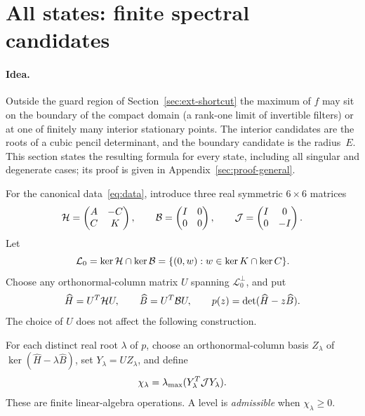 \section{All states: finite spectral candidates}
\label{sec:formula}

\paragraph{Idea.} Outside the guard region of Section~\ref{sec:ext-shortcut} the maximum of $f$ may sit on the boundary of the compact domain (a rank-one limit of invertible filters) or at one of finitely many interior stationary points. The interior candidates are the roots of a cubic pencil determinant, and the boundary candidate is the radius~$E$. This section states the resulting formula for every state, including all singular and degenerate cases; its proof is given in Appendix~\ref{sec:proof-general}.

For the canonical data~\eqref{eq:data}, introduce three real symmetric $6\times6$ matrices
\begin{equation}
 \mathcal H=\begin{pmatrix}A&-C\\C&K\end{pmatrix},\qquad
 \mathcal B=\begin{pmatrix}I&0\\0&0\end{pmatrix},\qquad
 \mathcal J=\begin{pmatrix}I&0\\0&-I\end{pmatrix}.
 \label{eq:pencil}
\end{equation}
Let
\begin{equation}
 \mathcal L_0=\ker\mathcal H\cap\ker\mathcal B
 =\{(0,w):w\in\ker K\cap\ker C\}.
\end{equation}
Choose any orthonormal-column matrix $U$ spanning $\mathcal L_0^\perp$, and put
\begin{equation}
 \widehat H=U^T\mathcal H U,\qquad \widehat B=U^T\mathcal B U,
 \qquad p(z)=\det(\widehat H-z\widehat B).
 \label{eq:regularized}
\end{equation}
The choice of $U$ does not affect the following construction.

For each distinct real root $\lambda$ of $p$, choose an orthonormal-column basis $Z_\lambda$ of
$\ker(\widehat H-\lambda\widehat B)$, set $Y_\lambda=UZ_\lambda$, and define
\begin{equation}
 \chi_\lambda=\lambda_{\max}(Y_\lambda^T\mathcal J Y_\lambda).
 \label{eq:eligibility}
\end{equation}
These are finite linear-algebra operations. A level is \emph{admissible} when $\chi_\lambda\ge0$.

